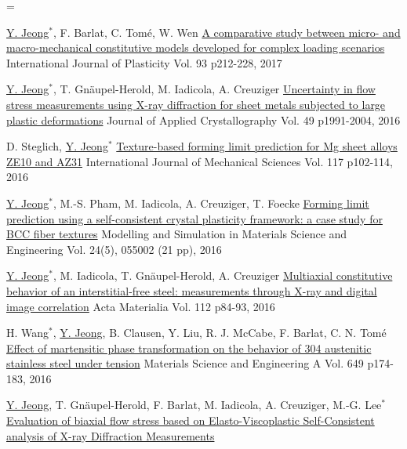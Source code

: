 \documentclass[11pt,a4paper]{awesome-cv}
\makeatletter
\let\realnormalsize=\normalsize
\def\liih@math{\ifmmode$\else\bad@math\fi}
\def\adjustnormalsize{\def\normalsize{\mathsurround=0pt \realnormalsize
 \parindent=0pt\abovedisplayskip=0pt\belowdisplayskip=0pt}%
 \def\phantompar{\csname par\endcsname}\normalsize}%
\newcommand\lthtmlvboxmathA{\adjustnormalsize\setbox\sizebox=\vbox\bgroup %
 \let\ifinner=\iffalse \let\)\liih@math }%
\newcommand\lthtmlmathtype[1]{\gdef\lthtmlmathenv{#1}}%
\newcommand\lthtmlfigureA[1]{\let\@savefreelist\@freelist
       \lthtmlmathtype{#1}\lthtmlvboxmathA}%
\makeatother
\begin{document}
{\newpage\clearpage
\lthtmlfigureA{cventries181}%
\begin{cventries}
  \cventry
  {\underline{Y. Jeong}$^*$, F. Barlat, C. Tom\'{e}, W. Wen}
  {\href{http://dx.doi.org/10.1016/j.ijplas.2016.07.015}{A comparative study between micro- and macro-mechanical constitutive models developed for complex loading scenarios}}
  {International Journal of Plasticity}
  {Vol. 93 p212-228, 2017} %
  {
  }
\par
\cventry
  {\underline{Y. Jeong}$^*$, T. Gn\"{a}upel-Herold, M. Iadicola, A. Creuziger} %
  {\href{https://doi.org/10.1107/S1600576716013662}{Uncertainty in flow stress measurements using X-ray diffraction for sheet metals subjected to large plastic deformations}} %
  {Journal of Applied Crystallography} %
  {Vol. 49 p1991-2004, 2016} %
  {
  }
\par
\cventry
  {D. Steglich, \underline{Y. Jeong}$^*$}
  {\href{http://dx.doi.org/10.1016/j.ijmecsci.2016.08.013}{Texture-based forming limit prediction for Mg sheet alloys ZE10 and AZ31}}
  { International Journal of Mechanical Sciences} %
  {Vol. 117 p102-114, 2016} %
  {
  }
\par
\cventry
  {\underline{Y. Jeong}$^*$, M.-S. Pham, M. Iadicola, A. Creuziger, T. Foecke}
  {\href{http://dx.doi.org/10.1088/0965-0393/24/5/055005}{Forming limit prediction using a self-consistent crystal plasticity framework: a case study for BCC fiber textures}}
  {Modelling and Simulation in Materials Science and Engineering}
  {Vol. 24(5), 055002 (21 pp), 2016} %
  {
  }
\par
\cventry
  {\underline{Y. Jeong}$^*$, M. Iadicola, T. Gn\"{a}upel-Herold, A. Creuziger}
  {\href{http://dx.doi.org/10.1016/j.actamat.2016.04.013}{Multiaxial constitutive behavior of an interstitial-free steel: measurements through X-ray and digital image correlation}}
  {Acta Materialia }
  {Vol. 112 p84-93, 2016}
  {
  }
\par
\cventry
  {H. Wang$^*$, \underline{Y. Jeong}, B. Clausen, Y. Liu, R. J. McCabe, F. Barlat, C. N. Tom\'{e}}
  {\href{http://dx.doi.org/10.1016/j.msea.2015.09.108}{Effect of martensitic phase transformation on the behavior of 304 austenitic stainless steel under tension}}
  {Materials Science and Engineering A }
  {Vol. 649 p174-183, 2016}
  {
  }
\par
\cventry
  {\underline{Y. Jeong}, T. Gn\"{a}upel-Herold, F. Barlat, M. Iadicola, A. Creuziger, M.-G. Lee$^*$}
  {\href{http://dx.doi.org/10.1016/j.ijplas.2014.06.009}{Evaluation of biaxial flow stress based on Elasto-Viscoplastic Self-Consistent analysis of X-ray Diffraction Measurements}}

\end{cventries}}
\end{document}

